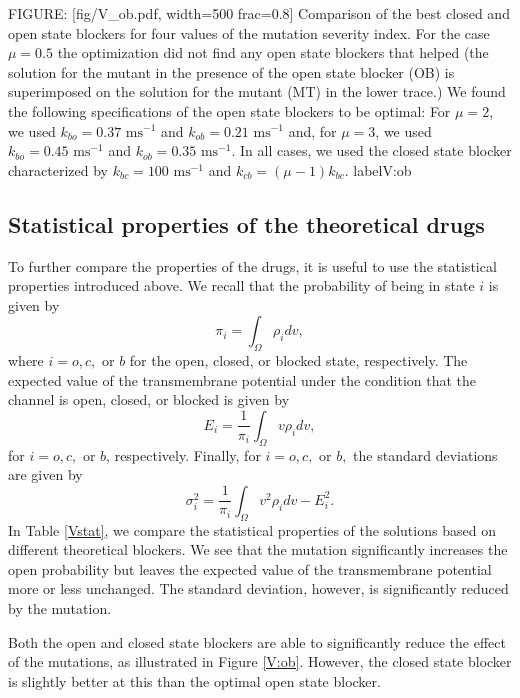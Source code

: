 FIGURE: [fig/V_ob.pdf, width=500 frac=0.8] Comparison of the best closed and open state blockers for four values of the mutation severity index.
For the case $\mu=0.5$ the optimization did not find any open state blockers that helped (the solution for the mutant in the presence of the open state blocker (OB) is superimposed on the solution for the mutant (MT) in the lower trace.) We found the following specifications of the open state blockers to be optimal: For $\mu=2$, we used 
 $k_{bo}=0.37\text{ ms}^{-1}$ and  $k_{ob}=0.21\text{ ms}^{-1}$  and, for  $\mu=3$, we used  $k_{bo}=0.45 \text{ ms}^{-1}$ and $k_{ob}=0.35\text{ ms}^{-1}$. In all cases, we used the closed state blocker characterized by $k_{bc}=100\text{ ms}^{-1}$ and $k_{cb}=\left(  \mu-1\right)  k_{bc}$.  label{V:ob}\bigskip

\subsection{Statistical properties of the theoretical drugs}

To further compare the properties of the drugs, it is useful
to use the statistical properties introduced above. We recall that the
probability of being in state $i$ is given by
\[
\pi_{i}=\int_{\Omega}\rho_{i}dv,
\]
where $i=o,c,$ or $b$ for the open, closed, or blocked state, respectively. The expected value of the transmembrane
potential under the condition that the channel is open, closed, or blocked is
given by
\[
E_{i}=\frac{1}{\pi_{i}}\int_{\Omega}v\rho_{i}dv,
\]
for $i=o,c,$ or $b$, respectively. Finally, for $i=o,c,$ or $b,$ the standard
deviations are given by
\[
\sigma_{i}^{2}=\frac{1}{\pi_{i}}\int_{\Omega}v^{2}\rho_{i}dv-E_{i}^{2}.
\]
In Table \ref{Vstat}, we compare the statistical properties of the solutions based on
different theoretical blockers. We see that the mutation significantly increases the open probability but leaves the expected value of the transmembrane potential more or less unchanged. The standard deviation, however, is significantly reduced by the mutation.

Both the open and closed state blockers are able to significantly reduce the effect of the mutations, as illustrated in
Figure \ref{V:ob}. However, the closed state blocker is slightly better at this than the optimal open state blocker.

